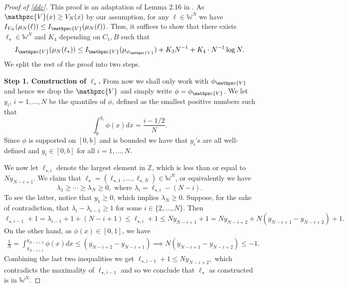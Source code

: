 \documentclass[reqno,11pt]{amsart}
\numberwithin{equation}{section}
\theoremstyle{definition}
\begin{document}
\begin{proof}[Proof of \ref{ddc}] This proof is an adaptation of Lemma 2.16 in \cite{das2022large}.
As $\mathpzc{V}(x) \ge V_N(x)$ by our assumption, for any $\ell\in \mathbb{W}^N$ we have $I_{V_N}(\mu_N(\ell)) \le I_{\mathpzc{V}}(\mu_N(\ell))$.
 Thus, it suffices to show that there exists $\ell_\star\in \mathbb{W}^N$ and $K_4$ depending on $C_1,B$ such that
\begin{equation}
    \label{bddd}
    \begin{aligned}
    I_{\mathpzc{V}}(\mu_N(\ell_\star)) \le I_{\mathpzc{V}}(\mu_{\phi_{\mathpzc{V}}})+K_3N^{-1}+K_4 \cdot N^{-1}\log N.
\end{aligned}
\end{equation}
We split the rest of the proof into two steps.

\medskip

\noindent\textbf{Step 1. Construction of ${\ell}_\star$.} From now we shall only work with $\phi_{\mathpzc{V}}$ and hence we drop the $\mathpzc{V}$ and simply write $\phi=\phi_{\mathpzc{V}}$.
 We let $y_i$, $i = 1, \dots, N$ be the quantiles of $\phi$, defined as the smallest positive numbers such that
$$\int_0^{y_i} \phi(x)dx = \frac{i - 1/2}{N}.$$
Since $\phi$ is supported on $[0,b]$ and is bounded we have that $y_i$'s are all well-defined and $y_i \in [0, b]$ for all $i = 1, \dots ,N$. 

We now let ${\ell}_{\star,i}$ denote the largest element in $\mathbb{Z}$, which is less than or equal to $N y_{N-i+1}$.  We claim that ${\ell}_{\star} = ({\ell}_{\star,1}, \dots, {\ell}_{\star,N}) \in \mathbb{W}^{N}$, or equivalently we have
$$ {\lambda}_1 \geq \cdots \geq {\lambda}_N \geq 0, \mbox{ where }{\lambda}_i = {\ell}_{\star,i} - (N-i).$$
To see the latter, notice that $y_1 \geq 0$, which implies ${\lambda}_N \geq 0$. 
Suppose, for the sake of contradiction, that ${\lambda}_i - {\lambda}_{i-1} \geq 1 \mbox{ for some $i \in \{2, \dots, N\}$.}$ Then
$${\ell}_{\star,i-1} + 1 = {\lambda}_{i-1} + 1 + (N-i + 1) \leq {\ell}_{\star,i} + 1 \leq Ny_{N-i+1} + 1 =  Ny_{N-i + 2} + N(y_{N-i + 1} - y_{N-i+2}) + 1.$$ 
On the other hand, as $\phi(x) \in [0, 1]$, we have 
\begin{align}\label{y_gap}
\frac1N = \int_{y_{N-i + 1}}^{y_{N-i + 2}} \phi(x)dx \leq  (y_{N-i + 2} - y_{N-i+1})  \implies N(y_{N-i + 1} - y_{N-i+2})  \le -1.
\end{align}
Combining the last two inequalities we get ${\ell}_{\star,i-1} + 1  \leq Ny_{N-i + 2},$
which contradicts the maximality of ${\ell}_{\star,i-1}$ and so we conclude that ${\ell}_\star$ as constructed is in $\mathbb{W}^{N}$.


\end{proof}
\end{document}
